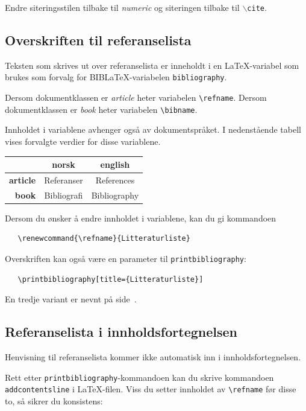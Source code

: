 \documentclass[11pt,norsk,a4paper]{article}
\newcommand{\kdo}[1]{\texttt{#1}}
\newcommand{\blt}{B{\smaller[2]IB}\discretionary{-}{}{\kern
    -0.12em}\LaTeX{}}
\begin{document}
Endre siteringsstilen tilbake til \textit{numeric} og siteringen tilbake til \kdo{$\backslash$cite}.


\subsection{Overskriften til referanselista}
Teksten som skrives ut over referanselista er inneholdt i en
\LaTeX-variabel som brukes som forvalg for \blt{}-variabelen
\kdo{bibliography}.

Dersom dokumentklassen er \textit{article} heter
variabelen \verb=\refname=. Dersom dokumentklassen er \textit{book}
heter variabelen \verb=\bibname=.

Innholdet i variablene avhenger også av
dokumentspråket. I nedenstående tabell~ vises forvalgte verdier for
disse variablene.

\begin{center}
\begin{tabular}{|r|c|c|}\hline
        &\textbf{norsk}&\textbf{english}\\ \hline
\textbf{article}&Referanser&References\\ \hline
\textbf{book}&Bibliografi&Bibliography\\ \hline
\end{tabular}

\end{center}
\noindent{}Dersom du ønsker å endre innholdet i variablene, kan du gi kommandoen

{\footnotesize\begin{verbatim}
   \renewcommand{\refname}{Litteraturliste}
\end{verbatim}}
\noindent{}Overskriften kan også være en parameter til
\kdo{printbibliography}:

{\footnotesize\begin{verbatim}
   \printbibliography[title={Litteraturliste}]
\end{verbatim}}
\noindent{}En tredje variant er nevnt på side~\pageref{heading}.

\subsection{Referanselista i innholdsfortegnelsen}\label{innhold}
Henvisning til referanselista kommer ikke automatisk inn i
innholdsfortegnelsen.  

Rett etter \texttt{printbibliography}-kommandoen kan du skrive kommandoen
\kdo{addcontentsline} i \LaTeX-filen. Viss du setter
innholdet av \verb=\refname= før disse to, så sikrer du konsistens:
\end{document}
